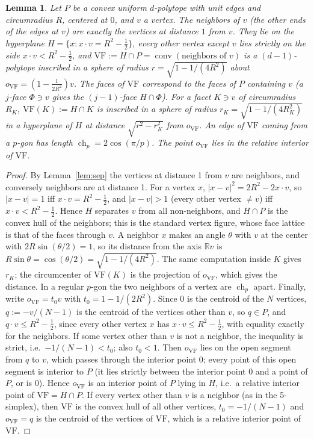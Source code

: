 \documentclass[11pt]{article}
\newtheorem{lemma}[theorem]{Lemma}
\theoremstyle{definition}
\theoremstyle{remark}
\newcommand{\R}{\mathbb{R}}
\newcommand{\VF}{\mathrm{VF}}
\newcommand{\conv}{\operatorname{conv}}
\newcommand{\ch}{\operatorname{ch}}
\begin{document}
\begin{appendices}
\label{sec:closure}
\begin{lemma}\label{lem:vf}
Let $P$ be a convex uniform $d$-polytope with unit edges and circumradius
$R$, centered at $0$, and $v$ a vertex. The neighbors of $v$ (the other
ends of the edges at $v$) are exactly the vertices at distance $1$ from
$v$. They lie on the hyperplane $H=\{x: x\cdot v=R^2-\tfrac12\}$, every other
vertex except $v$ lies strictly on the side $x\cdot v<R^2-\frac12$, and
$\VF:=H\cap P=\conv(\text{neighbors of }v)$ is a $(d-1)$-polytope
inscribed in a sphere of radius $r=\sqrt{1-1/(4R^2)}$ about
$o_{\VF}=(1-\frac{1}{2R^2})v$. The faces of $\VF$ correspond to the faces
of $P$ containing $v$ (a $j$-face $\Phi\ni v$ gives the $(j-1)$-face
$H\cap\Phi$). For a facet $K\ni v$ of circumradius $R_K$, $\VF(K):=H\cap K$
is inscribed in a sphere of radius $r_K=\sqrt{1-1/(4R_K^2)}$ in a
hyperplane of $H$ at distance $\sqrt{r^2-r_K^2}$ from $o_{\VF}$. An edge of
$\VF$ coming from a $p$-gon has length $\ch_p=2\cos(\pi/p)$. The point
$o_{\VF}$ lies in the relative interior of $\VF$.
\end{lemma}
\begin{proof}
By Lemma~\ref{lem:sep} the vertices at distance 1 from $v$ are neighbors,
and conversely neighbors are at distance 1. For a vertex $x$,
$|x-v|^2=2R^2-2x\cdot v$, so $|x-v|=1$ iff $x\cdot v=R^2-\frac12$, and
$|x-v|>1$ (every other vertex $\ne v$) iff $x\cdot v<R^2-\frac12$. Hence $H$
separates $v$ from all non-neighbors, and $H\cap P$ is the convex hull of
the neighbors; this is the standard vertex figure, whose face lattice is
that of the faces through $v$. A neighbor $x$ makes an angle $\theta$
with $v$ at the center with $2R\sin(\theta/2)=1$, so its distance from
the axis $\R v$ is $R\sin\theta=\cos(\theta/2)=\sqrt{1-1/(4R^2)}$. The
same computation inside $K$ gives $r_K$; the circumcenter of $\VF(K)$ is
the projection of $o_{\VF}$, which gives the distance. In a regular
$p$-gon the two neighbors of a vertex are $\ch_p$ apart. Finally, write
$o_{\VF}=t_0v$ with $t_0=1-1/(2R^2)$. Since $0$ is the centroid of the $N$
vertices, $q:=-v/(N-1)$ is the centroid of the vertices other than $v$, so
$q\in P$, and $q\cdot v\le R^2-\frac12$, since every other vertex $x$ has
$x\cdot v\le R^2-\frac12$, with equality exactly for the neighbors. If some
vertex other than $v$ is not a neighbor, the inequality is strict, i.e.\
$-1/(N-1)<t_0$; also $t_0<1$. Then $o_{\VF}$ lies on the open segment from
$q$ to $v$, which passes through the interior point $0$; every point of
this open segment is interior to $P$ (it lies strictly between the
interior point $0$ and a point of $P$, or is $0$). Hence $o_{\VF}$ is an
interior point of $P$ lying in $H$, i.e.\ a relative interior point of
$\VF=H\cap P$. If every vertex other than $v$ is a neighbor (as in the
5-simplex), then $\VF$ is the convex hull of all other vertices, $t_0=-1/(N-1)$
and $o_{\VF}=q$ is the centroid of the vertices of $\VF$, which is a
relative interior point of $\VF$.
\end{proof}



\end{appendices}
\end{document}
